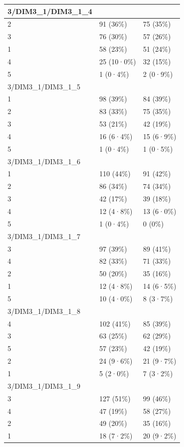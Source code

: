 \documentclass[
]{book}
\begin{document}
\begin{tabular}{l|l|l}
\hline
3/DIM3\_1/DIM3\_1\_4 &  & \\
\hline
2 & 91 (36\%) & 75 (35\%)\\
\hline
3 & 76 (30\%) & 57 (26\%)\\
\hline
1 & 58 (23\%) & 51 (24\%)\\
\hline
4 & 25 (10·0\%) & 32 (15\%)\\
\hline
5 & 1 (0·4\%) & 2 (0·9\%)\\
\hline
3/DIM3\_1/DIM3\_1\_5 &  & \\
\hline
1 & 98 (39\%) & 84 (39\%)\\
\hline
2 & 83 (33\%) & 75 (35\%)\\
\hline
3 & 53 (21\%) & 42 (19\%)\\
\hline
4 & 16 (6·4\%) & 15 (6·9\%)\\
\hline
5 & 1 (0·4\%) & 1 (0·5\%)\\
\hline
3/DIM3\_1/DIM3\_1\_6 &  & \\
\hline
1 & 110 (44\%) & 91 (42\%)\\
\hline
2 & 86 (34\%) & 74 (34\%)\\
\hline
3 & 42 (17\%) & 39 (18\%)\\
\hline
4 & 12 (4·8\%) & 13 (6·0\%)\\
\hline
5 & 1 (0·4\%) & 0 (0\%)\\
\hline
3/DIM3\_1/DIM3\_1\_7 &  & \\
\hline
3 & 97 (39\%) & 89 (41\%)\\
\hline
4 & 82 (33\%) & 71 (33\%)\\
\hline
2 & 50 (20\%) & 35 (16\%)\\
\hline
1 & 12 (4·8\%) & 14 (6·5\%)\\
\hline
5 & 10 (4·0\%) & 8 (3·7\%)\\
\hline
3/DIM3\_1/DIM3\_1\_8 &  & \\
\hline
4 & 102 (41\%) & 85 (39\%)\\
\hline
3 & 63 (25\%) & 62 (29\%)\\
\hline
5 & 57 (23\%) & 42 (19\%)\\
\hline
2 & 24 (9·6\%) & 21 (9·7\%)\\
\hline
1 & 5 (2·0\%) & 7 (3·2\%)\\
\hline
3/DIM3\_1/DIM3\_1\_9 &  & \\
\hline
3 & 127 (51\%) & 99 (46\%)\\
\hline
4 & 47 (19\%) & 58 (27\%)\\
\hline
2 & 49 (20\%) & 35 (16\%)\\
\hline
1 & 18 (7·2\%) & 20 (9·2\%)\\

\end{tabular}
\end{document}
